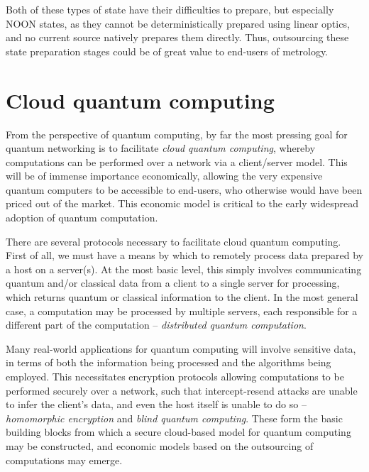 \documentclass[aps,rmp,twocolumn,amsmath,amssymb,nofootinbib,superscriptaddress,longbibliography,floatfix]{revtex4-1}
\begin{document}
Both of these types of state have their difficulties to prepare, but especially NOON states, as they cannot be deterministically prepared using linear optics, and no current source natively prepares them directly. Thus, outsourcing these state preparation stages could be of great value to end-users of metrology.

\cite{DomBerry}

%
%

\section{Cloud quantum computing} \label{sec:cloud}

From the perspective of quantum computing, by far the most pressing goal for quantum networking is to facilitate \emph{cloud quantum computing}, whereby computations can be performed over a network via a client/server model. This will be of immense importance economically, allowing the very expensive quantum computers to be accessible to end-users, who otherwise would have been priced out of the market. This economic model is critical to the early widespread adoption of quantum computation.

There are several protocols necessary to facilitate cloud quantum computing. First of all, we must have a means by which to remotely process data prepared by a host on a server(s). At the most basic level, this simply involves communicating quantum and/or classical data from a client to a single server for processing, which returns quantum or classical information to the client. In the most general case, a computation may be processed by multiple servers, each responsible for a different part of the computation -- \emph{distributed quantum computation}.

Many real-world applications for quantum computing will involve sensitive data, in terms of both the information being processed and the algorithms being employed. This necessitates encryption protocols allowing computations to be performed securely over a network, such that intercept-resend attacks are unable to infer the client's data, and even the host itself is unable to do so -- \emph{homomorphic encryption} and \emph{blind quantum computing}. These form the basic building blocks from which a secure cloud-based model for quantum computing may be constructed, and economic models based on the outsourcing of computations may emerge.

%
%
\end{document}
